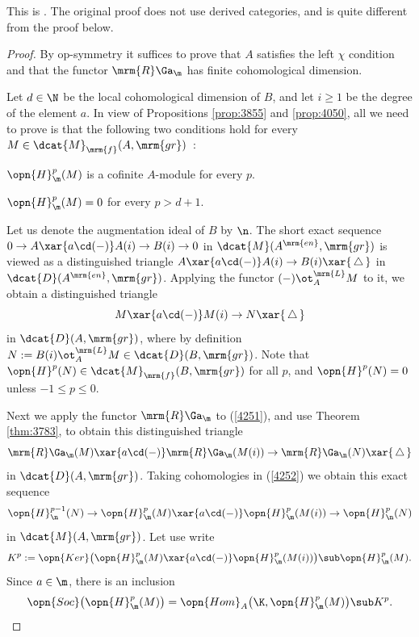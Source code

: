 This is \cite[Theorem 8.8]{ArZh}. The original proof does not use 
derived categories, and is quite different from the proof below. 

\begin{proof}
By op-symmetry it suffices to prove that $A$ satisfies the left $\chi$ 
condition and that the functor $\mrm{R} \Ga_{\m}$ has finite cohomological 
dimension. 

Let $d \in \N$ be the local cohomological dimension of $B$, and let 
$i \geq 1$ be the degree of the element $a$. 
In view of Propositions \ref{prop:3855} and \ref{prop:4050}, all we need to 
prove is that the following two conditions hold for every 
$M \in \dcat{M}_{\mrm{f}}(A, \mrm{gr})$~:
\begin{itemize}
 $\opn{H}^p_{\m}(M)$ is a cofinite $A$-module for every $p$.

 $\opn{H}^p_{\m}(M) = 0$ for every $p > d + 1$. 
\end{itemize}

Let us denote the augmentation ideal of $B$ by $\n$. 
The short exact sequence 
$0 \to A \xar{a \cd (-)} A(i) \to B(i) \to 0$
in $\dcat{M}(A^{\mrm{en}}, \mrm{gr})$ is viewed as a distinguished triangle
$A \xar{a \cd (-)} A(i) \to B(i) \xar{ \, \triangle \, }$
in $\dcat{D}(A^{\mrm{en}}, \mrm{gr})$. 
Applying the functor $(-) \ot^{\mrm{L}}_{A} M$ to it, we obtain a 
distinguished triangle 
\begin{equation} \label{4251}
M \xar{a \cd (-)} M(i) \to N \xar{ \, \triangle \, }
\end{equation}
in $\dcat{D}(A, \mrm{gr})$, where by definition 
$N := B(i) \ot^{\mrm{L}}_{A} M \in \dcat{D}(B, \mrm{gr})$.
Note that 
$\opn{H}^{p}(N) \in \dcat{M}_{\mrm{f}}(B, \mrm{gr})$
for all $p$, and $\opn{H}^{p}(N) = 0$ unless $-1 \leq p \leq 0$. 

Next we apply the functor $\mrm{R} \Ga_{\m}$ to (\ref{4251}), and use Theorem 
\ref{thm:3783}, to obtain this distinguished triangle 
\begin{equation} \label{4252}
\mrm{R} \Ga_{\m}(M) \xar{a \cd (-)} \mrm{R} \Ga_{\m}(M(i)) \to 
\mrm{R} \Ga_{\n}(N) \xar{ \, \triangle \, }
\end{equation}
in $\dcat{D}(A, \mrm{gr})$.
Taking cohomologies in (\ref{4252}) we obtain this exact sequence 
\begin{equation} \label{4253}
\opn{H}^{p - 1}_{\n}(N) \to 
\opn{H}^{p}_{\m}(M) \xar{a \cd (-)}
\opn{H}^{p}_{\m}(M(i)) \to  
\opn{H}^{p}_{\n}(N) 
\end{equation}
in $\dcat{M}(A, \mrm{gr})$. 
Let use write 
\[ K^p := \opn{Ker} \bigl( \opn{H}^{p}_{\m}(M) \xar{a \cd (-)}
\opn{H}^{p}_{\m}(M(i)) \bigr) \sub \opn{H}^{p}_{\m}(M) . \]
Since $a \in \m$, there is an inclusion 
\begin{equation} \label{4254}
\opn{Soc} \bigl( \opn{H}^{p}_{\m}(M) \bigr) =
\opn{Hom}_{A} \bigl( \K, \opn{H}^{p}_{\m}(M) \bigr) \sub K^p . 
\end{equation}


\end{proof}
